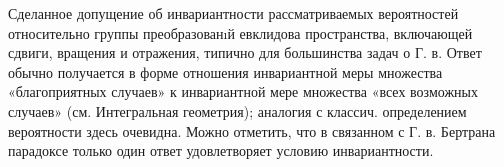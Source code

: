 \documentclass[10pt]{article}
\begin{document}
Сделанное допущение об инвариантности рассматриваемых вероятностей относительно группы преобразованıй евклидова пространства, включающей сдвиги, вращения и отражения, типично для большинства задач о Г. в. Ответ обычно получается в форме отношения инвариантной меры множества «благоприятных случаев» к инвариантной мере множества «всех возможных случаев» (см. Интегральная геометрия); аналогия с классич. определением вероятности здесь очевидна. Можно отметить, что в связанном с Г. в. Бертрана парадоксе только один ответ удовлетворяет условию инвариантности.
\end{document}
